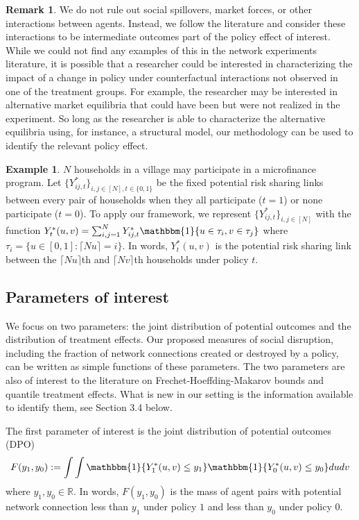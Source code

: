 \documentclass[12pt]{article}
\theoremstyle{definition}
\newtheorem{remark}{Remark}
\newtheorem{myexp}{Example}
\begin{document}
\begin{remark}
We do not rule out social spillovers, market forces, or other interactions between agents. Instead, we follow the literature and consider these interactions to be intermediate outcomes part of the policy effect of interest. While we could not find any examples of this in the network experiments literature, it is possible that a researcher could be interested in characterizing the impact of a change in policy under counterfactual interactions not observed in one of the treatment groups. For example, the researcher may be interested in alternative market equilibria that could have been but were not realized in the experiment. So long as the researcher is able to characterize the alternative equilibria using, for instance, a structural model, our methodology can be used to identify the relevant policy effect.  
\end{remark}

\begin{myexp}
$N$ households in a village may participate in a microfinance program. Let $\{Y_{ij,t}^{*}\}_{i,j \in [N], t \in \{0,1\}}$ be the fixed potential risk sharing links between every pair of households when they all participate ($t=1$) or none participate ($t=0$). To apply our framework, we represent $\{Y_{ij,t}^{*}\}_{i,j \in [N]}$ with the function $Y_{t}^{*}(u,v) = \sum_{i,j=1}^{N}Y_{ij,t}^{*}\mathbbm{1}\{u \in \tau_{i}, v \in \tau_{j}\}$ where  $\tau_{i} = \{u \in [0,1]: \lceil Nu\rceil = i\}$. In words, $Y_{t}^{*}(u,v)$ is the potential risk sharing link between the $\lceil Nu\rceil$th and $\lceil Nv \rceil$th households under policy $t$.    
\end{myexp}


\subsection{Parameters of interest}
We focus on two parameters: the joint distribution of potential outcomes and the distribution of treatment effects. Our proposed measures of social disruption, including the fraction of network connections created or destroyed by a policy, can be written as simple functions of these parameters. The two parameters are also of interest to the literature on Frechet-Hoeffding-Makarov bounds and quantile treatment effects. What is new in our setting is the information available to identify them, see Section 3.4 below.  

The first parameter of interest is the joint distribution of potential outcomes (DPO)
\begin{align}\label{joint}
F(y_{1},y_{0}) := \int\int\mathbbm{1}\{Y^{*}_{1}(u,v)\leq y_{1}\}\mathbbm{1}\{Y^{*}_{0}(u,v)\leq y_{0}\}dudv
\end{align}
where $y_{1},y_{0} \in \mathbb{R}$. In words, $F(y_{1},y_{0}) $ is the mass of agent pairs with potential network connection less than $y_{1}$ under policy $1$ and less than $y_{0}$ under policy $0$.  
\end{document}

